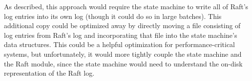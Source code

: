 As described, this approach would require the state machine to write all of
Raft's log entries into its own log (though it could do so in large
batches). This additional copy could be optimized away by directly
moving a file consisting of log entries from Raft's log and
incorporating that file into the state machine's data structures.
This could be a helpful optimization for performance-critical systems, but
unfortunately, it would more tightly couple the state machine and the
Raft module, since the state machine would need to understand the
on-disk representation of the Raft log.
